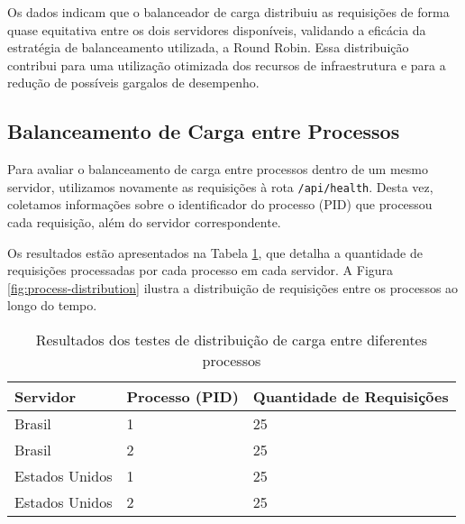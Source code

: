Os dados indicam que o balanceador de carga distribuiu as requisições de forma quase equitativa entre os dois servidores disponíveis, validando a eficácia da estratégia de balanceamento utilizada, a Round Robin. Essa distribuição contribui para uma utilização otimizada dos recursos de infraestrutura e para a redução de possíveis gargalos de desempenho.

\subsection{Balanceamento de Carga entre Processos}

Para avaliar o balanceamento de carga entre processos dentro de um mesmo servidor, utilizamos novamente as requisições à rota \texttt{/api/health}. Desta vez, coletamos informações sobre o identificador do processo (PID) que processou cada requisição, além do servidor correspondente.

Os resultados estão apresentados na Tabela \ref{tab:process-distribution}, que detalha a quantidade de requisições processadas por cada processo em cada servidor. A Figura \ref{fig:process-distribution} ilustra a distribuição de requisições entre os processos ao longo do tempo.


\begin{table}[H]
    \centering
    \caption{Resultados dos testes de distribuição de carga entre diferentes processos}
    \label{tab:process-distribution}
    \begin{tabular}{|l|l|l|}
        \hline
        \textbf{Servidor} & \textbf{Processo (PID)} & \textbf{Quantidade de Requisições} \\ \hline
        Brasil            & 1                 & 25                                 \\ \hline
        Brasil            & 2                 & 25                                 \\ \hline
        Estados Unidos    & 1                 & 25                                 \\ \hline
        Estados Unidos    & 2                 & 25                                 \\ \hline
    \end{tabular}
\end{table}


